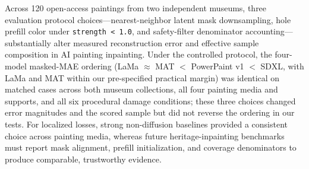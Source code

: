 \documentclass[applsci,article,submit,pdftex,moreauthors]{Definitions/mdpi}
\begin{document}
Across 120 open-access paintings from two independent museums, three evaluation protocol choices---nearest-neighbor latent mask downsampling, hole prefill color under \texttt{strength\ \textless{}\ 1.0}, and safety-filter denominator accounting---substantially alter measured reconstruction error and effective sample composition in AI painting inpainting. Under the controlled protocol, the four-model masked-MAE ordering (LaMa \(\approx\) MAT \(\!<\!\) PowerPaint v1 \(\!<\!\) SDXL, with LaMa and MAT within our pre-specified practical margin) was identical on matched cases across both museum collections, all four painting media and supports, and all six procedural damage conditions; these three choices changed error magnitudes and the scored sample but did not reverse the ordering in our tests. For localized losses, strong non-diffusion baselines provided a consistent choice across painting media, whereas future heritage-inpainting benchmarks must report mask alignment, prefill initialization, and coverage denominators to produce comparable, trustworthy evidence.
\FloatBarrier
{}




\end{document}
